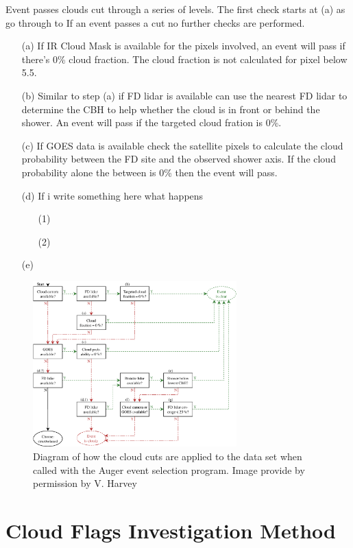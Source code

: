 Event passes clouds cut through a series of levels. The first check starts at (a) as go through to  If an event passes a cut no further checks are performed.

\begin{itemize}
\item[(a)] If IR Cloud Mask is available for the pixels involved, an event will pass if there's 0\% cloud fraction. The cloud fraction is not calculated for pixel below 5.5\textdegree. 
\item[(b)] Similar to step (a) if FD lidar is available can use the nearest FD lidar to determine the CBH to help whether the cloud is in front or behind the shower. An event will pass if the targeted cloud fration is 0\%.
\item[(c)] If GOES data is available check the satellite pixels to calculate the cloud probability between the FD site and the observed shower axis. If the cloud probability alone the between is 0\% then the event will pass.
\item[(d)] If i write something here what happens
\begin{itemize}
\item[(1)]
\item[(2)]
\end{itemize}
\item[(e)]
\end{itemize}

\begin{figure}
\centering
\includegraphics[width=0.7\textwidth]{chapters/graphs/CloudFlags/cloud_cuts.pdf}
\caption{Diagram of how the cloud cuts are applied to the data set when called with the Auger event selection program. Image provide by permission by V. Harvey}
\end{figure}

\section{Cloud Flags Investigation Method}

